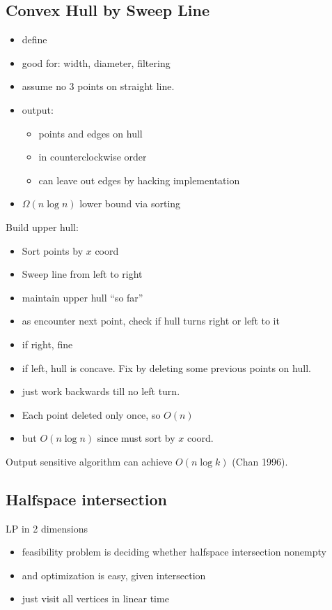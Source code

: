 \documentclass{article}
\begin{document}
\subsection{Convex Hull by Sweep Line}
\begin{itemize}
\item define
\item good for: width, diameter, filtering
\item assume no 3 points on straight line.
\item output:
  \begin{itemize}
  \item points and edges on hull
  \item in counterclockwise order
  \item can leave out edges by hacking implementation
  \end{itemize}
\item $\Omega(n\log n)$ lower bound via sorting
\end{itemize}

Build upper hull:
\begin{itemize}
\item Sort points by $x$ coord
\item Sweep line from left to right
\item maintain upper hull ``so far''
\item as encounter next point, check if hull turns right or left to it
\item if right, fine
\item if left, hull is concave.  Fix by deleting some previous points
  on hull.
\item just work backwards till no left turn.
\item Each point deleted only once, so $O(n)$
\item but $O(n\log n)$ since must sort by $x$ coord.
\end{itemize}

Output sensitive algorithm can achieve $O(n\log k)$ (Chan 1996).

\subsection{Halfspace intersection}

LP in 2 dimensions
\begin{itemize}
\item feasibility problem is deciding whether halfspace intersection
  nonempty
\item and optimization is easy, given intersection
\item just visit all vertices in linear time
\end{itemize}
\end{document}
